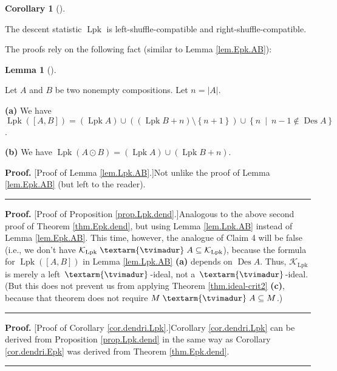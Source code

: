 \documentclass[numbers=enddot,12pt,final,onecolumn,notitlepage]{scrartcl}%
\theoremstyle{definition}
\newtheorem{lem}[theo]{Lemma}
\newenvironment{lemma}[1][]
{\begin{lem}[#1]\begin{leftbar}}
{\end{leftbar}\end{lem}}
\newtheorem{coro}[theo]{Corollary}
\newenvironment{corollary}[1][]
{\begin{coro}[#1]\begin{leftbar}}
{\end{leftbar}\end{coro}}
\newenvironment{proof}[1][Proof]{\noindent\textbf{#1.} }{\ \rule{0.5em}{0.5em}}
\newcommand{\tvi}{\left. \textarm{\tvimadur} \right.}
\begin{document}
\begin{corollary}
\label{cor.dendri.Lpk}The descent statistic $\operatorname*{Lpk}$ is
left-shuffle-compatible and right-shuffle-compatible.
\end{corollary}

The proofs rely on the following fact (similar to Lemma \ref{lem.Epk.AB}):

\begin{lemma}
\label{lem.Lpk.AB}Let $A$ and $B$ be two nonempty compositions. Let
$n=\left\vert A\right\vert $.

\textbf{(a)} We have $\operatorname*{Lpk}\left(  \left[  A,B\right]  \right)
=\left(  \operatorname*{Lpk}A\right)  \cup\left(  \left(  \operatorname*{Lpk}%
B+n\right)  \setminus\left\{  n+1\right\}  \right)  \cup\left\{
n\ \mid\ n-1\notin\operatorname*{Des}A\right\}  $.

\textbf{(b)} We have $\operatorname*{Lpk}\left(  A\odot B\right)  =\left(
\operatorname*{Lpk}A\right)  \cup\left(  \operatorname*{Lpk}B+n\right)  $.
\end{lemma}

\begin{proof}
[Proof of Lemma \ref{lem.Lpk.AB}.]Not unlike the proof of Lemma
\ref{lem.Epk.AB} (but left to the reader).
\end{proof}

\begin{proof}
[Proof of Proposition \ref{prop.Lpk.dend}.]Analogous to the above second proof
of Theorem \ref{thm.Epk.dend}, but using Lemma \ref{lem.Lpk.AB} instead of
Lemma \ref{lem.Epk.AB}. This time, however, the analogue of Claim 4 will be
false (i.e., we don't have $\mathcal{K}_{\operatorname*{Lpk}}\tvi
A\subseteq\mathcal{K}_{\operatorname*{Lpk}}$), because the formula for
$\operatorname*{Lpk}\left(  \left[  A,B\right]  \right)  $ in Lemma
\ref{lem.Lpk.AB} \textbf{(a)} depends on $\operatorname*{Des}A$. Thus,
$\mathcal{K}_{\operatorname*{Lpk}}$ is merely a left $\tvi$-ideal, not a
$\tvi$-ideal. (But this does not prevent us from applying Theorem
\ref{thm.ideal-crit2} \textbf{(c)}, because that theorem does not require
$M\tvi A\subseteq M$.)
\end{proof}

\begin{proof}
[Proof of Corollary \ref{cor.dendri.Lpk}.]Corollary \ref{cor.dendri.Lpk} can
be derived from Proposition \ref{prop.Lpk.dend} in the same way as Corollary
\ref{cor.dendri.Epk} was derived from Theorem \ref{thm.Epk.dend}.
\end{proof}
\end{document}
